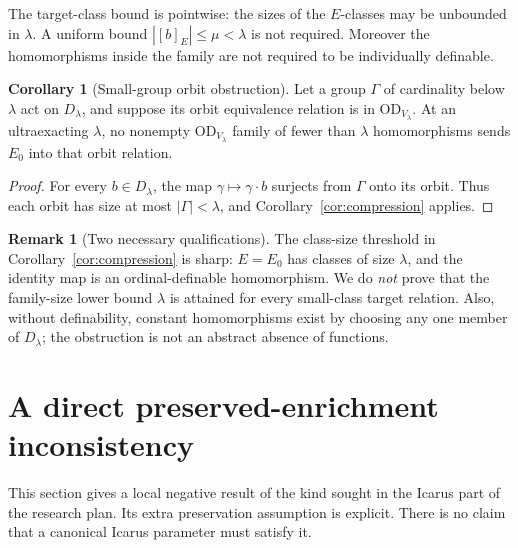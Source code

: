 \documentclass[11pt,letterpaper]{article}
\theoremstyle{definition}
\newtheorem{corollary}[definition]{Corollary}
\newtheorem{remark}[definition]{Remark}
\numberwithin{equation}{section}
\newcommand{\OD}{\mathrm{OD}}
\newcommand{\D}{D_\lambda}
\newcommand{\ODlow}{\OD_{V_\lambda}}
\begin{document}
The target-class bound is pointwise: the sizes of the $E$-classes may be unbounded in $\lambda$. A uniform bound $|[b]_E|\le\mu<\lambda$ is not required. Moreover the homomorphisms inside the family are not required to be individually definable.

\begin{corollary}[Small-group orbit obstruction]\label{cor:group}
Let a group $\Gamma$ of cardinality below $\lambda$ act on $\D$, and suppose its orbit equivalence relation is in $\ODlow$. At an ultraexacting $\lambda$, no nonempty $\ODlow$ family of fewer than $\lambda$ homomorphisms sends $E_0$ into that orbit relation.
\end{corollary}
\begin{proof}
For every $b\in\D$, the map $\gamma\mapsto\gamma\cdot b$ surjects from $\Gamma$ onto its orbit. Thus each orbit has size at most $|\Gamma|<\lambda$, and Corollary~\ref{cor:compression} applies.
\end{proof}

\begin{remark}[Two necessary qualifications]
The class-size threshold in Corollary~\ref{cor:compression} is sharp: $E=E_0$ has classes of size $\lambda$, and the identity map is an ordinal-definable homomorphism. We do \emph{not} prove that the family-size lower bound $\lambda$ is attained for every small-class target relation. Also, without definability, constant homomorphisms exist by choosing any one member of $\D$; the obstruction is not an abstract absence of functions.
\end{remark}

\section{A direct preserved-enrichment inconsistency}\label{sec:icarus}

This section gives a local negative result of the kind sought in the Icarus part of the research plan. Its extra preservation assumption is explicit. There is no claim that a canonical Icarus parameter must satisfy it.
\end{document}
